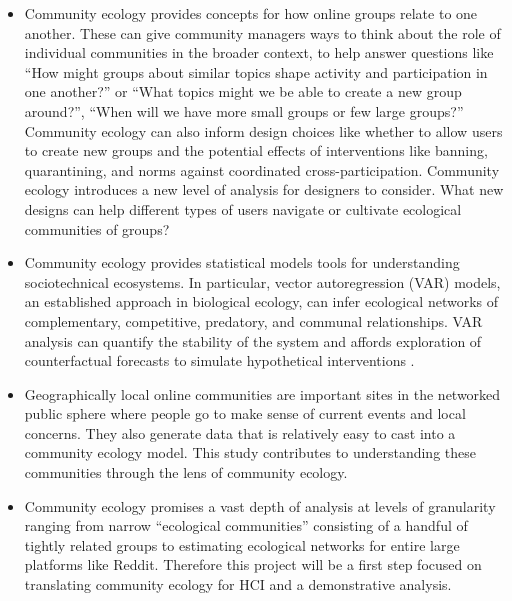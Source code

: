 \documentclass[12pt]{memoir}
\begin{document}
\begin{itemize}
\item Community ecology provides concepts for how online groups relate to one another.  These can give community managers ways to think about the role of individual communities in the broader context, to help answer questions like ``How might groups about similar topics shape activity and participation in one another?'' or ``What topics might we be able to create a new group around?'', ``When will we have more small groups or few large groups?'' Community ecology can also inform design choices like whether to allow users to create new groups and the potential effects of interventions like banning, quarantining, and norms against coordinated cross-participation. Community ecology introduces a new level of analysis for designers to consider.  What new designs can help different types of users navigate or cultivate ecological communities of groups? 

\item Community ecology provides statistical models tools for understanding sociotechnical ecosystems.  In particular, vector autoregression (VAR) models, an established approach in biological ecology, can infer ecological networks of complementary, competitive, predatory, and communal relationships.  VAR analysis can quantify the stability of the system and affords exploration of counterfactual forecasts to simulate hypothetical interventions \citep{ives_estimating_2003}. 

\item Geographically local online communities are important sites in the networked public sphere where people go to make sense of current events and local concerns.  They also generate data that is relatively easy to cast into a community ecology model.  This study contributes to understanding these communities through the lens of community ecology.

\item Community ecology promises a vast depth of analysis at levels of granularity ranging from narrow ``ecological communities'' consisting of a handful of tightly related groups to estimating ecological networks for entire large platforms like Reddit.  Therefore this project will be a first step focused on translating community ecology for HCI and a demonstrative analysis.

\end{itemize}
\end{document}
